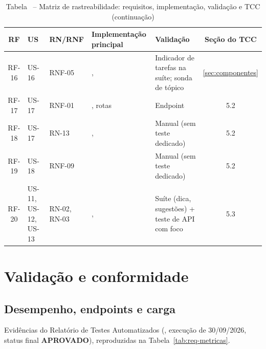 \begin{table}[H]
\centering
\setlength{\tabcolsep}{2pt}
\caption*{Tabela \thetable\ -- Matriz de rastreabilidade: requisitos, implementação, validação e TCC (continuação)}
\begin{tabularx}{\textwidth}{|C|L{1.6cm}|L{2.5cm}|Y|Y|C|}
\hline
\textbf{RF} & \textbf{US} & \textbf{RN/RNF} & \textbf{Implemen\-tação principal} & \textbf{Validação} & \textbf{Seção do TCC} \\
\hline
RF-16 & US-16 & RNF-05 & \texttt{}, \texttt{} & Indicador de tarefas na suíte; sonda de tópico & \ref{sec:componentes} \\
\hline
RF-17 & US-17 & RNF-01 & \texttt{}, rotas \texttt{} & Endpoint \texttt{} & 5.2 \\
\hline
RF-18 & US-17 & RN-13 & \texttt{}, \texttt{} & Manual (sem teste dedicado) & 5.2 \\
\hline
RF-19 & US-18 & RNF-09 & \texttt{} & Manual (sem teste dedicado) & 5.2 \\
\hline
RF-20 & US-11, US-12, US-13 & RN-02, RN-03 & \texttt{}, \texttt{} & Suíte (dica, sugestões) + teste de API com foco & 5.3 \\
\hline
\end{tabularx}
\end{table}

\section{Validação e conformidade}
\label{ap:req-validacao}

\subsection{Desempenho, endpoints e carga}
\label{ap:req-desempenho}

Evidências do Relatório de Testes Automatizados (\texttt{}, execução de 30/09/2026, status final \textbf{APROVADO}), reproduzidas na Tabela~\ref{tab:req-metricas}.


